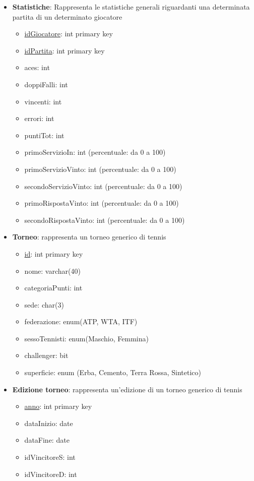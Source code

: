 \documentclass[10pt]{article}
\begin{document}
\begin{itemize}
    \item \textbf{Statistiche}: Rappresenta le statistiche generali riguardanti una determinata partita di un determinato giocatore
    \begin{itemize}
        \item \underline{idGiocatore}: int primary key
        \item \underline{idPartita}: int primary key
        \item aces: int
        \item doppiFalli: int
        \item vincenti: int
        \item errori: int
        \item puntiTot: int
        \item primoServizioIn: int (percentuale: da 0 a 100)
        \item primoServizioVinto: int (percentuale: da 0 a 100)
        \item secondoServizioVinto: int (percentuale: da 0 a 100)
        \item primoRispostaVinto: int (percentuale: da 0 a 100)
        \item secondoRispostaVinto: int (percentuale: da 0 a 100)
    \end{itemize}
    
    \item \textbf{Torneo}: rappresenta un torneo generico di tennis
    \begin{itemize}
        \item \underline{id}: int primary key
        \item nome: varchar(40) 
        \item categoriaPunti: int
        \item sede: char(3)
        \item federazione: enum(ATP, WTA, ITF)
        \item sessoTennisti: enum(Maschio, Femmina)
        \item challenger: bit
        \item superficie: enum (Erba, Cemento, Terra Rossa, Sintetico)
    \end{itemize}
    
    \item \textbf{Edizione torneo}: rappresenta un'edizione di un torneo generico di tennis
    \begin{itemize}
        \item \underline{anno}: int primary key
        \item dataInizio: date
        \item dataFine: date
        \item idVincitoreS: int
        \item idVincitoreD: int
    \end{itemize}

\end{itemize}
\end{document}
